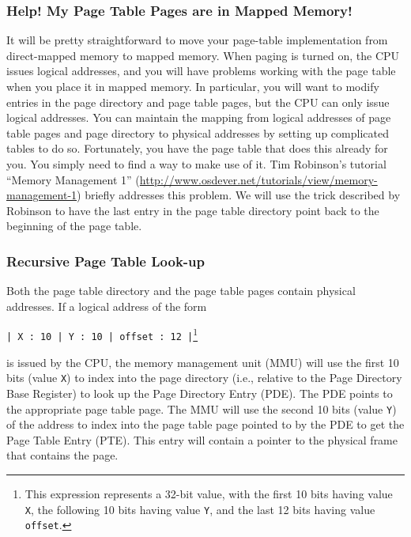 \documentclass[letterpaper,11pt]{article}
\begin{document}
\subsubsection*{Help! My Page Table Pages are in Mapped Memory!}
It will be pretty straightforward to move your page-table
implementation from direct-mapped memory to mapped memory. 
When paging is turned on, the CPU issues logical
addresses, and you will have problems working with the page table when
you place it in mapped memory. In particular, you will want to modify
entries in the page directory and page table pages, but the CPU can
only issue logical addresses. 
You can maintain the mapping from logical addresses of page table
pages and page directory to physical addresses by setting up
complicated tables to do so. Fortunately, you have the page table that
does this already for you. You simply need to find a way to make use
of it. 
Tim Robinson's tutorial ``Memory Management 1''
(\url{http://www.osdever.net/tutorials/view/memory-management-1})
briefly addresses this problem. We will use
the trick described by Robinson to have the last entry in the page
table directory point back to the beginning of the page table.

\subsubsection*{Recursive Page Table Look-up}

Both the page table directory and the page table pages contain
physical addresses. If a logical address of the form 
\begin{center}
{\tt | X : 10 | Y : 10 | offset : 12 |}\footnote{This expression represents
  a 32-bit value, with the first 10 bits having value {\tt X}, the following
  10 bits having value {\tt Y}, and the last 12 bits having value {\tt offset}.}
\end{center}
is issued by the CPU, the memory management unit (MMU) will use the
first 10 bits (value {\tt X}) to index into the page directory (i.e.,
relative to the Page Directory Base Register) to look up the Page
Directory Entry (PDE). The PDE points to the appropriate page table
page. The MMU will use the second 10 bits (value {\tt Y}) of the address to
index into the page table page pointed to by the PDE to get the Page
Table Entry (PTE). This entry will contain a pointer to the physical
frame that contains the page.
\end{document}
